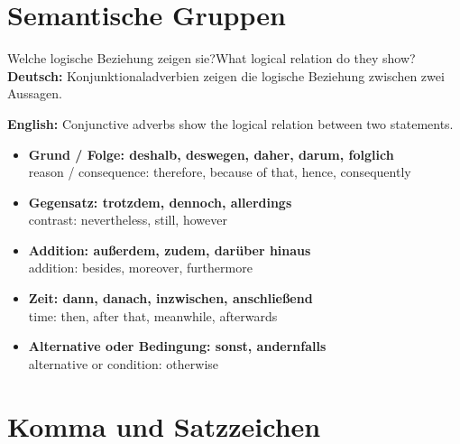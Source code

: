 \documentclass[a4paper,11pt]{article}
\newcommand{\GermanText}[1]{\textbf{Deutsch: }#1\par}
\newcommand{\EnglishText}[1]{{\small\color{SoftGray}\textbf{English: }#1\par}}
\newcommand{\ExampleItem}[2]{\item \textbf{#1}\\{\small\color{SoftGray}#2}}
\begin{document}
    
    \section{Semantische Gruppen}
        
        \begin{grammarentry}{Welche logische Beziehung zeigen sie?}{What logical relation do they show?}
            \GermanText{Konjunktionaladverbien zeigen die logische Beziehung zwischen zwei Aussagen.}
            \EnglishText{Conjunctive adverbs show the logical relation between two statements.}
            
            \begin{exbox}
                \begin{itemize}
                    \ExampleItem{Grund / Folge: deshalb, deswegen, daher, darum, folglich}{reason / consequence: therefore, because of that, hence, consequently}
                    \ExampleItem{Gegensatz: trotzdem, dennoch, allerdings}{contrast: nevertheless, still, however}
                    \ExampleItem{Addition: außerdem, zudem, darüber hinaus}{addition: besides, moreover, furthermore}
                    \ExampleItem{Zeit: dann, danach, inzwischen, anschließend}{time: then, after that, meanwhile, afterwards}
                    \ExampleItem{Alternative oder Bedingung: sonst, andernfalls}{alternative or condition: otherwise}
                \end{itemize}
            \end{exbox}
        \end{grammarentry}
    
    
    \section{Komma und Satzzeichen}
        
\end{document}
